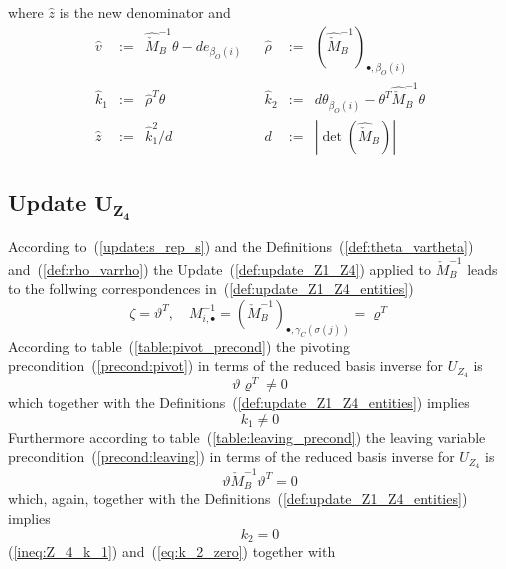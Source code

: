 \documentclass[a4paper]{article}
\begin{document}
where $\hat{z}$ is the new denominator and
\begin{equation}
\label{def:update_Z1_entities}
\begin{array}{rclcrcl}
\hat{v}
&:=&
\hat{\check{M}}_{B}^{-1}\theta - d e_{\beta_{O}(i)}
&&
\hat{\rho}
&:=&
\left(\hat{\check{M}}_{B}^{-1}\right)_{\bullet, \beta_{O}(i)}
\\
\hat{k}_{1}
&:=&
\hat{\rho}^{T}\theta
&&
\hat{k}_{2}
&:=&
d\theta_{\beta_{O}(i)}- \theta^{T}\hat{\check{M}}_{B}^{-1}\theta
\\
\hat{z}
&:=&
\hat{k}_{1}^{2}/d
&&
d
&:=&
\left|\det(\hat{\check{M}}_{B})\right|
\end{array}
\end{equation}

\subsection{Update $\mathbf{U_{Z_{4}}}$}
According to~(\ref{update:s_rep_s}) and the
Definitions~(\ref{def:theta_vartheta})
and~(\ref{def:rho_varrho})
the Update~(\ref{def:update_Z1_Z4})
applied to $\check{M}_{B}^{-1}$ leads to the follwing correspondences
in~(\ref{def:update_Z1_Z4_entities})
\begin{equation}
\zeta=\vartheta^{T},
\quad
M_{i, \bullet}^{-1}
=
\left(\check{M}_{B}^{-1}\right)_{\bullet, \gamma_{C}(\sigma(j))}
=
\varrho^{T}
\end{equation}
According to table~(\ref{table:pivot_precond}) the
pivoting precondition~(\ref{precond:pivot})
in terms of the reduced basis inverse for $U_{Z_{4}}$ is
\begin{equation*}
\vartheta \varrho^{T} \neq 0
\end{equation*}
which together with the Definitions~(\ref{def:update_Z1_Z4_entities}) implies 
\begin{equation}
\label{ineq:Z_4_k_1}
k_{1} \neq 0
\end{equation}
Furthermore according to table~(\ref{table:leaving_precond})
the leaving variable precondition~(\ref{precond:leaving})
in terms of the reduced basis inverse for $U_{Z_{4}}$ is 
\begin{equation*}
\vartheta\check{M}_{B}^{-1}\vartheta^{T} = 0 
\end{equation*}
which, again, together with the Definitions~(\ref{def:update_Z1_Z4_entities})
implies
\begin{equation}
\label{eq:k_2_zero}
k_{2} = 0
\end{equation}
(\ref{ineq:Z_4_k_1}) and~(\ref{eq:k_2_zero}) together with
\end{document}
